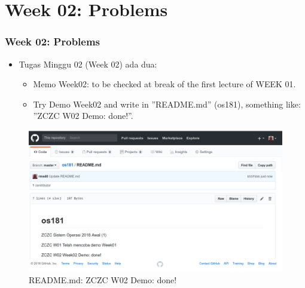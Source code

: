 \documentclass[xcolor=table, notheorems, hyperref={pdfpagelabels=false}]{beamer}
\begin{document}
\section{Week 02: Problems}
\begin{frame}
\frametitle{Week 02: Problems}
\begin{itemize}
\item Tugas Minggu 02 (Week 02) ada dua:
\begin{itemize}
\item Memo Week02: to be checked  at break of the first lecture of WEEK 01.
\item Try Demo Week02 and write in ''README.md'' (os181), something like:
                 ''ZCZC W02 Demo: done!''.
\end{itemize}
\end{itemize}

\begin{figure}
\includegraphics[width=0.80\linewidth]{os02-README}
\caption{README.md: ZCZC W02 Demo: done!}
\end{figure}

\end{frame}

\end{document}
